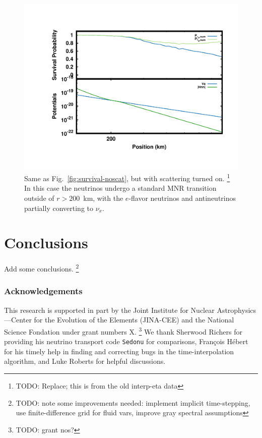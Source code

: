 \documentclass[aps,floatfix,prd,superscriptaddress,twocolumn]{revtex4-1}
\begin{document}
\begin{figure}
  \includegraphics[width=\columnwidth]{fig-survival_prob-scat_nh}
  \caption{Same as Fig.~\ref{fig:survival-noscat},
    but with scattering turned on.
    \footnote{TODO: Replace; this is from the old interp-eta data}
    In this case the neutrinos undergo a standard MNR transition
    outside of $r>200$~km,
    with the $e$-flavor neutrinos and antineutrinos
    partially converting to $\nu_x$.
    }
  \label{fig:survival-scat}
\end{figure}

\section{Conclusions}
\label{sec:conclusions}
Add some conclusions.
\footnote{TODO: note some improvements needed: implement implicit time-stepping,
  use finite-difference grid for fluid vars, improve gray spectral assumptions}

\subsubsection*{Acknowledgements}
This research is supported in part by the Joint Institute for Nuclear
Astrophysics---Center for the Evolution of the Elements (JINA-CEE)
and the National Science Fondation under grant numbers X. \footnote{TODO: grant nos?}
We thank Sherwood Richers for providing his neutrino transport code
\lstinline{Sedonu} for comparisons,
Fran\c{c}ois H\'{e}bert for his timely help in finding and
correcting bugs in the time-interpolation algorithm,
and Luke Roberts for helpful discussions.
\end{document}
